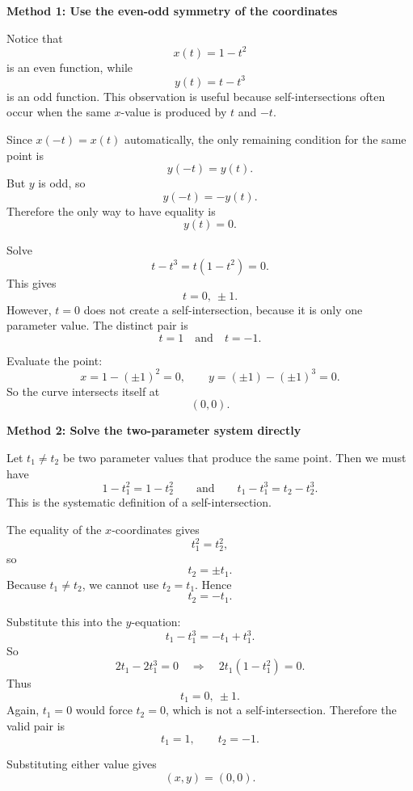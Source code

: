 \documentclass[a4paper,12pt,twocolumn]{article}
\newenvironment{solutionbox}{\begin{framed}}{\end{framed}}
\begin{document}
\begin{solutionbox}
\textbf{Method 1: Use the even-odd symmetry of the coordinates}

\begin{steps}
\item Notice that
\[
x(t)=1-t^2
\]
is an even function, while
\[
y(t)=t-t^3
\]
is an odd function. This observation is useful because self-intersections often occur when the same \(x\)-value is produced by \(t\) and \(-t\).

\item Since \(x(-t)=x(t)\) automatically, the only remaining condition for the same point is
\[
y(-t)=y(t).
\]
But \(y\) is odd, so
\[
y(-t)=-y(t).
\]
Therefore the only way to have equality is
\[
y(t)=0.
\]

\item Solve
\[
t-t^3=t(1-t^2)=0.
\]
This gives
\[
t=0,\ \pm 1.
\]
However, \(t=0\) does not create a self-intersection, because it is only one parameter value. The distinct pair is
\[
t=1\quad\text{and}\quad t=-1.
\]

\item Evaluate the point:
\[
x=1-(\pm 1)^2=0,
\qquad
y=(\pm 1)-(\pm 1)^3=0.
\]
So the curve intersects itself at
\[
(0,0).
\]
\end{steps}
\end{solutionbox}

\begin{solutionbox}
\textbf{Method 2: Solve the two-parameter system directly}

\begin{steps}
\item Let \(t_1\neq t_2\) be two parameter values that produce the same point. Then we must have
\[
1-t_1^2=1-t_2^2
\qquad\text{and}\qquad
t_1-t_1^3=t_2-t_2^3.
\]
This is the systematic definition of a self-intersection.

\item The equality of the \(x\)-coordinates gives
\[
t_1^2=t_2^2,
\]
so
\[
t_2=\pm t_1.
\]
Because \(t_1\neq t_2\), we cannot use \(t_2=t_1\). Hence
\[
t_2=-t_1.
\]

\item Substitute this into the \(y\)-equation:
\[
t_1-t_1^3=-t_1+t_1^3.
\]
So
\[
2t_1-2t_1^3=0
\quad\Longrightarrow\quad
2t_1(1-t_1^2)=0.
\]
Thus
\[
t_1=0,\ \pm 1.
\]
Again, \(t_1=0\) would force \(t_2=0\), which is not a self-intersection. Therefore the valid pair is
\[
t_1=1,\qquad t_2=-1.
\]

\item Substituting either value gives
\[
(x,y)=(0,0).
\]
\end{steps}
\end{solutionbox}
\end{document}
